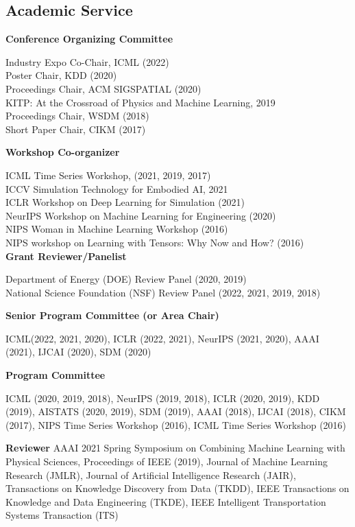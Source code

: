 \documentclass[margin,line]{res}
\begin{document}
\begin{resume}
 


\section{\sc Academic Service}


{\bf Conference Organizing Committee}

Industry Expo Co-Chair, ICML (2022)\\
Poster Chair, KDD (2020) \\
Proceedings Chair, ACM SIGSPATIAL (2020) \\
KITP: At the Crossroad of Physics and Machine Learning,  2019\\
Proceedings Chair, WSDM (2018)\\
Short Paper Chair, CIKM (2017)

{\bf Workshop Co-organizer}

ICML Time Series  Workshop, (2021, 2019, 2017) \\
ICCV Simulation Technology for Embodied AI, 2021\\
ICLR Workshop on Deep  Learning for Simulation (2021) \\
NeurIPS  Workshop on Machine Learning for Engineering (2020)\\
NIPS Woman in Machine Learning Workshop (2016) \\
NIPS workshop on Learning with Tensors: Why Now and How? (2016) \\




{\bf Grant Reviewer/Panelist}

 Department of Energy (DOE) Review Panel (2020, 2019) \\
National Science Foundation (NSF) Review Panel (2022, 2021, 2019, 2018)



{\bf Senior Program Committee (or Area Chair)}

 ICML(2022, 2021, 2020), ICLR (2022, 2021), NeurIPS (2021, 2020), AAAI (2021), IJCAI (2020), SDM (2020)

{\bf Program Committee}

ICML (2020, 2019, 2018), NeurIPS (2019, 2018), ICLR (2020, 2019), KDD (2019), AISTATS (2020, 2019), SDM (2019), AAAI (2018), IJCAI (2018), CIKM (2017), NIPS Time Series Workshop (2016), ICML Time Series Workshop (2016)


{\bf Reviewer}
AAAI 2021 Spring Symposium on Combining Machine Learning with Physical Sciences,
Proceedings of IEEE (2019), Journal of Machine Learning Research (JMLR), Journal of Artificial Intelligence Research (JAIR), Transactions on Knowledge Discovery from Data (TKDD), IEEE Transactions on Knowledge and Data Engineering (TKDE),  IEEE Intelligent Transportation Systems Transaction (ITS)



\end{resume}
\end{document}
